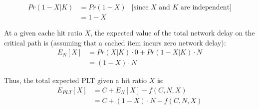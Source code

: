 \begin{align*}
Pr(1-X | K) & = Pr(1-X) & \text{[since $X$ and $K$ are independent]} \\
& = 1-X &
\end{align*}

At a given cache hit ratio $X$, the expected value of the total network delay
on the critical path is (assuming that a cached item incurs zero network delay):
\begin{align*}
E_N[X] & = Pr(X|K) \cdot 0 + Pr(1-X|K) \cdot N \\
& = (1 - X) \cdot N
\end{align*}

Thus, the total expected PLT given a hit ratio $X$ is:
\begin{align*}
E_{PLT}[X] & = C + E_N[X] - f(C,N,X) \\
& = C + (1 - X) \cdot N - f(C,N,X)
\end{align*}

